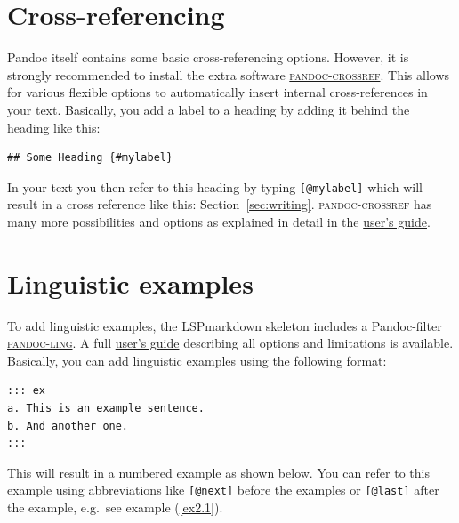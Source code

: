 \hypertarget{cross-referencing}{%
\section{Cross-referencing}\label{cross-referencing}}

Pandoc\paragraphnumber{[2.4]} itself contains some basic
cross-referencing options. However, it is strongly recommended to
install the extra software
\href{https://github.com/lierdakil/pandoc-crossref}{\textsc{pandoc-crossref}}.
This allows for various flexible options to automatically insert
internal cross-references in your text. Basically, you add a label to a
heading by adding it behind the heading like this:

\begin{verbatim}
## Some Heading {#mylabel}
\end{verbatim}

In\paragraphnumber{[2.5]} your text you then refer to this heading by
typing \texttt{{[}@mylabel{]}} which will result in a cross reference
like this: Sec­tion~\ref{sec:writing}. \textsc{pandoc-crossref} has many
more possibilities and options as explained in detail in the
\href{https://lierdakil.github.io/pandoc-crossref/}{user's guide}.

\hypertarget{linguistic-examples}{%
\section{Linguistic examples}\label{linguistic-examples}}

To\paragraphnumber{[2.6]} add linguistic examples, the LSPmarkdown
skeleton includes a Pandoc-filter
\href{https://github.com/cysouw/pandoc-ling}{\textsc{pandoc-ling}}. A
full \href{https://cysouw.github.io/pandoc-ling/readme.html}{user's
guide} describing all options and limitations is available. Basically,
you can add linguistic examples using the following format:

\begin{verbatim}
::: ex
a. This is an example sentence.
b. And another one.
:::
\end{verbatim}

This\paragraphnumber{[2.7]} will result in a numbered example as shown
below. You can refer to this example using abbreviations like
\texttt{{[}@next{]}} before the examples or \texttt{{[}@last{]}} after
the example, e.g.~see example (\ref{ex2.1}).

\begin{samepage}
\ea \judgewidth{} \label{ex2.1} 
  \z
\z
\end{samepage}

